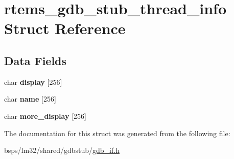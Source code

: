 \hypertarget{structrtems__gdb__stub__thread__info}{}\section{rtems\+\_\+gdb\+\_\+stub\+\_\+thread\+\_\+info Struct Reference}
\label{structrtems__gdb__stub__thread__info}
\subsection*{Data Fields}
\begin{DoxyCompactItemize}
\item 
\mbox{\label{structrtems__gdb__stub__thread__info_ae311bc1cb7d9c59af71c6efb428a6812}} 
char {\bfseries display} \mbox{[}256\mbox{]}
\item 
\mbox{\label{structrtems__gdb__stub__thread__info_a58b35de11c946ef8e83abf0cdf37e586}} 
char {\bfseries name} \mbox{[}256\mbox{]}
\item 
\mbox{\label{structrtems__gdb__stub__thread__info_a79bf3b290b6f51f9bbc2cb1dd339cad6}} 
char {\bfseries more\+\_\+display} \mbox{[}256\mbox{]}
\end{DoxyCompactItemize}


The documentation for this struct was generated from the following file\+:\begin{DoxyCompactItemize}
\item 
bsps/lm32/shared/gdbstub/\mbox{\hyperlink{lm32_2shared_2gdbstub_2gdb__if_8h}{gdb\+\_\+if.\+h}}\end{DoxyCompactItemize}
